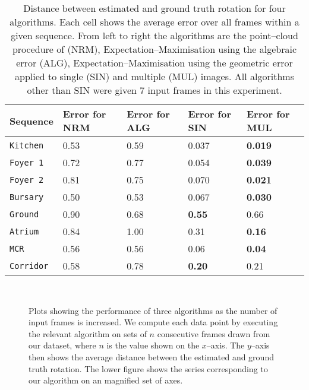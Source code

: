 \begin{table}[tb]
  \centering
  \begin{tabular}{@{}p{2cm}p{3cm}p{3cm}p{3cm}p{3cm}@{}}
    \toprule
    Sequence & Error for NRM & Error for ALG & Error for SIN & Error
    for MUL \\
    \midrule
    \tt{Kitchen}  & 0.53   & 0.59   & 0.037  & \textbf{0.019} \\
    \tt{Foyer 1}   & 0.72   & 0.77   & 0.054  & \textbf{0.039} \\
    \tt{Foyer 2}  & 0.81   & 0.75   & 0.070  & \textbf{0.021} \\
    \tt{Bursary}  & 0.50   & 0.53   & 0.067  & \textbf{0.030} \\
    \tt{Ground}   & 0.90   & 0.68   & \textbf{0.55}   & 0.66 \\
    \tt{Atrium}   & 0.84   & 1.00   & 0.31  & \textbf{0.16} \\
    \tt{MCR}      & 0.56   & 0.56   & 0.06  & \textbf{0.04} \\
    \tt{Corridor} & 0.58   & 0.78   & \textbf{0.20}  & 0.21 \\
    \bottomrule
  \end{tabular}
  \vspace{0.2cm}
  \caption{Distance between estimated and ground truth rotation for
    four algorithms. Each cell shows the average error over all frames
    within a given sequence. From left to right the algorithms are
    the point--cloud procedure of \cite{Furukawa09} (NRM),
    Expectation--Maximisation using the algebraic error (ALG),
    Expectation--Maximisation using the geometric error applied to
    single (SIN) and multiple (MUL) images. All algorithms other than
    SIN were given 7 input frames in this experiment.}
  \label{table:rot-performance}
\end{table}

\begin{figure}[p]
  \centering
  \\
  \caption{Plots showing the performance of three algorithms as the
    number of input frames is increased. We compute each data point by
    executing the relevant algorithm on sets of $n$ consecutive frames
    drawn from our dataset, where $n$ is the value shown on the
    $x$--axis. The $y$--axis then shows the average distance between
    the estimated and ground truth rotation. The lower figure shows
    the series corresponding to our algorithm on an magnified set of
    axes.}
  \label{fig:error-vs-nframes}
\end{figure}


